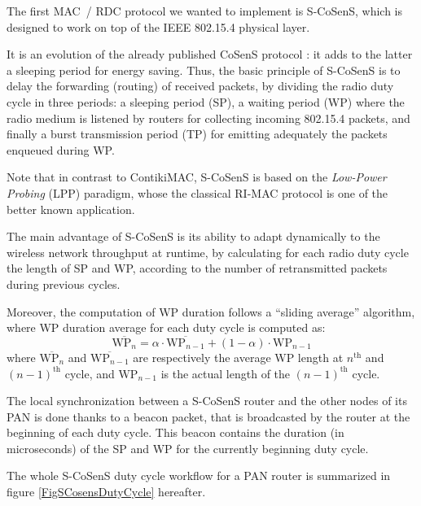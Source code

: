 \documentclass[a4paper,twoside]{article}
\begin{document}
The first MAC~/ RDC protocol we wanted to implement is S-CoSenS, which
is designed to work on top of the IEEE 802.15.4 physical layer.

It is an evolution of the already published CoSenS protocol \cite{CosensConf}:
it adds to the latter a sleeping period for energy saving.
Thus, the basic principle of S-CoSenS is to delay the forwarding (routing)
of received packets, by dividing the radio duty cycle in three periods:
a sleeping period (SP), a waiting period (WP) where the radio medium
is listened by routers for collecting incoming 802.15.4 packets, and
finally a burst transmission period (TP) for emitting adequately
the packets enqueued during WP.

Note that in contrast to ContikiMAC, S-CoSenS is based on the \emph{Low-Power
Probing} (LPP) paradigm, whose the classical RI-MAC protocol \cite{RIMAC}
is one of the better known application.

The main advantage of S-CoSenS is its ability to adapt dynamically to the
wireless network throughput at runtime, by calculating for each radio duty
cycle the length of SP and WP, according to the number of retransmitted
packets during previous cycles.

Moreover, the computation of WP duration follows a ``sliding average''
algorithm, where WP duration average for each duty cycle is computed as:
\begin{displaymath}
\overline{\mathrm{WP}_{n}} = \alpha \cdot \overline{\mathrm{WP}_{n-1}}
                + (1 - \alpha) \cdot \mathrm{WP}_{n-1}
\end{displaymath}
where $\overline{\mathrm{WP}_{n}}$ and $\overline{\mathrm{WP}_{n-1}}$
are respectively the average WP length at $n^{\mathrm{th}}$ and
$(n-1)^{\mathrm{th}}$ cycle, and $\mathrm{WP}_{n-1}$ is the actual
length of the $(n-1)^{\mathrm{th}}$ cycle.

The local synchronization between a S-CoSenS router and the other nodes
of its PAN is done thanks to a beacon packet, that is broadcasted by
the router at the beginning of each duty cycle. This beacon contains the
duration (in microseconds) of the SP and WP for the currently beginning
duty cycle.

The whole S-CoSenS duty cycle workflow for a PAN router is summarized
in figure \ref{FigSCosensDutyCycle} hereafter.
\end{document}
